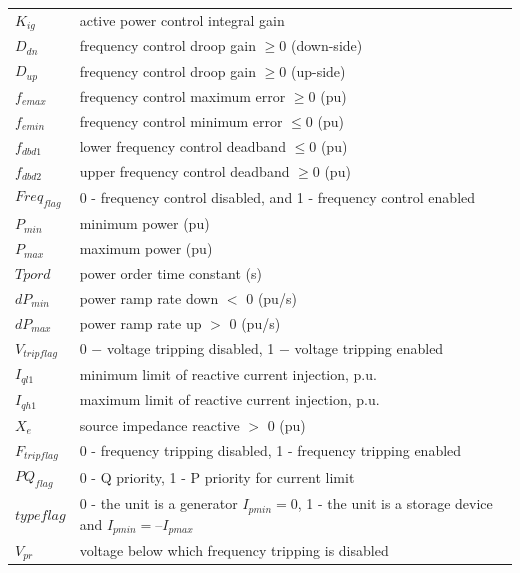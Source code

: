 \documentclass[journal]{IEEEtran}
\begin{document}
\begin{table}
\begin{tabular}{|p{30pt}|p{185pt}|}
			$K_{ig}$& 
			active power control integral gain\\
			$D_{dn}$& 
			frequency control droop gain $\geqslant 0$ (down-side)\\
			$D_{up}$& 
			frequency control droop gain $\geqslant 0$ (up-side)\\
			$f_{emax}$& 
			frequency control maximum error $\geqslant 0$ (pu)\\
			$f_{emin}$& 
			frequency control minimum error $\leqslant 0$ (pu)\\
			$f_{dbd1}$& 
			lower frequency control deadband $\leqslant 0$ (pu)\\
			$f_{dbd2}$& 
			upper frequency control deadband $\geqslant 0$ (pu)\\
			$Freq_{flag}$& 
			0 - frequency control disabled, and 1 - frequency control enabled\\
			$P_{min}$& 
			minimum power (pu)\\
			$P_{max}$& 
			maximum power (pu)\\
			$Tpord$& 
			power order time constant (s)\\
			$dP_{min}$& 
			power ramp rate down $<$ 0 (pu/s)\\
			$dP_{max}$& 
			power ramp rate up $>$ 0 (pu/s)\\
			$V_{tripflag}$& 
			0 $-$ voltage tripping disabled, 1 $-$ voltage tripping enabled\\
			$I_{ql1}$& 
			minimum limit of reactive current injection, p.u.\\
			$I_{qh1}$& 
			maximum limit of reactive current injection, p.u.\\
			$X_{e}$& 
			source impedance reactive $>$ 0 (pu)\\
			$F_{tripflag}$& 
			0 - frequency tripping disabled, 1 - frequency tripping enabled\\
			$PQ_{flag}$& 
			0 - Q priority, 1 - P priority for current limit\\
			$typeflag$& 
			0 - the unit is a generator $I_{pmin} = 0$, 1 - the unit is a storage device and $I_{pmin} = – I_{pmax}$\\
			$V_{pr}$& 
			voltage below which frequency tripping is disabled\\
			\hline
		\end{tabular}
		\label{tab1}
	\end{table}
\end{document}

